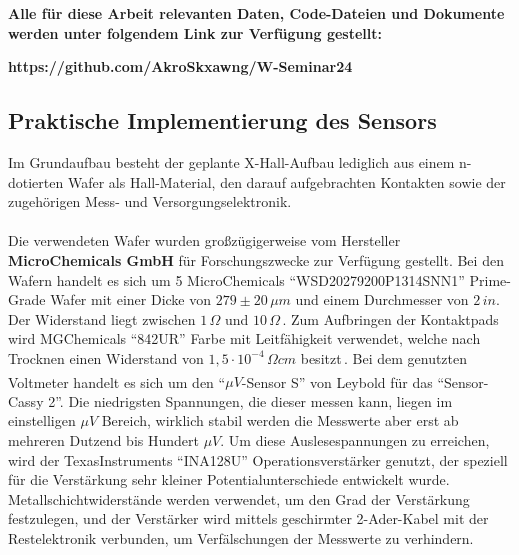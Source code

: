 \documentclass[12pt, a4paper]{article}
\begin{document}
{\raggedright
	\textbf{Alle für diese Arbeit relevanten Daten, Code-Dateien und Dokumente werden unter folgendem Link zur Verfügung gestellt:}}
\begin{center}
	\textbf{https://github.com/AkroSkxawng/W-Seminar24}
\end{center}



\subsection{Praktische Implementierung des Sensors}
Im Grundaufbau besteht der geplante X-Hall-Aufbau lediglich aus einem n-dotierten Wafer als Hall-Material, den darauf aufgebrachten Kontakten sowie der zugehörigen Mess- und Versorgungselektronik.\paragraph{}
Die verwendeten Wafer wurden großzügigerweise vom Hersteller \textbf{MicroChemicals GmbH} für Forschungszwecke zur Verfügung gestellt.\newline
Bei den Wafern handelt es sich um 5 MicroChemicals ``WSD20279200P1314SNN1'' Prime-Grade Wafer mit einer Dicke von $279\pm20\,\mu{m}$ und einem Durchmesser von $2\,in$. Der Widerstand liegt zwischen $1\,\Omega$ und $10\,\Omega$\,\cite{mcChem}.\newline
Zum Aufbringen der Kontaktpads wird MGChemicals ``842UR'' Farbe mit Leitfähigkeit verwendet, welche nach Trocknen einen Widerstand von $1,5\cdot10^{-4}\,\Omega{cm}$ besitzt\,\cite{mgChem}.\newline
Bei dem genutzten Voltmeter handelt es sich um den ``$\mu{V}$-Sensor S'' von Leybold\textsuperscript{\textregistered} für das ``Sensor-Cassy 2''. Die niedrigsten Spannungen, die dieser messen kann, liegen im einstelligen $\mu{V}$ Bereich, wirklich stabil werden die Messwerte aber erst ab mehreren Dutzend bis Hundert $\mu{V}$.\newline
Um diese Auslesespannungen zu erreichen, wird der TexasInstruments ``INA128U'' Operationsverstärker genutzt, der speziell für die Verstärkung sehr kleiner Potentialunterschiede entwickelt wurde. Metallschichtwiderstände werden verwendet, um den Grad der Verstärkung festzulegen, und der Verstärker wird mittels geschirmter 2-Ader-Kabel mit der Restelektronik verbunden, um Verfälschungen der Messwerte zu verhindern.\paragraph{}
\end{document}
